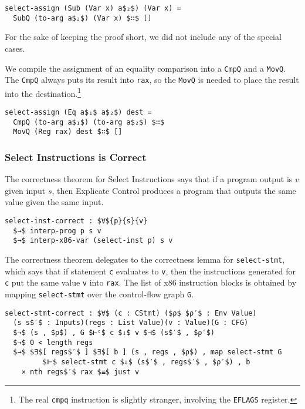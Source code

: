 \documentclass[sigplan,review,dvipsnames,screen,10pt]{acmart}
\begin{document}
\begin{lstlisting}
select-assign (Sub (Var x) a$₂$) (Var x) = 
  SubQ (to-arg a$₂$) (Var x) $∷$ []
\end{lstlisting}

\noindent For the sake of keeping the proof short, we did not include
any of the special cases.

We compile the assignment of an equality comparison into a
\lstinline{CmpQ} and a \lstinline{MovQ}. The \lstinline{CmpQ} always
puts its result into \lstinline{rax}, so the \lstinline{MovQ} is
needed to place the result into the destination.\footnote{The real
\lstinline{cmpq} instruction is slightly stranger, involving
the \lstinline{EFLAGS} register.}

\begin{lstlisting}
select-assign (Eq a$₁$ a$₂$) dest =
  CmpQ (to-arg a$₁$) (to-arg a$₂$) $∷$
  MovQ (Reg rax) dest $∷$ []
\end{lstlisting}


\subsubsection{Select Instructions is Correct}

The correctness theorem for Select Instructions says that if a program
output is $v$ given input $s$, then Explicate Control produces a
program that outputs the same value given the same input.

\begin{lstlisting}
select-inst-correct : $∀${p}{s}{v}
  $→$ interp-prog p s v
  $→$ interp-x86-var (select-inst p) s v
\end{lstlisting}

The correctness theorem delegates to the correctness lemma for
\lstinline{select-stmt}, which says that if statement \lstinline{c}
evaluates to \lstinline{v}, then the instructions generated for
\lstinline{c} put the same value \lstinline{v} into \lstinline{rax}.
The list of x86 instruction blocks is obtained by mapping
\lstinline{select-stmt} over the control-flow graph \lstinline{G}.

\begin{lstlisting}[basicstyle=\ttfamily\footnotesize]
select-stmt-correct : $∀$ (c : CStmt) ($ρ$ $ρ′$ : Env Value)
  (s s$′$ : Inputs)(regs : List Value)(v : Value)(G : CFG)
  $→$ (s , $ρ$) , G $⊢ᶜ$ c $⇓$ v $⊣$ (s$′$ , $ρ′$)
  $→$ 0 < length regs
  $→$ $∃$[ regs$′$ ] $∃$[ b ] (s , regs , $ρ$) , map select-stmt G
         $⊩$ select-stmt c $⇓$ (s$′$ , regs$′$ , $ρ′$) , b
    × nth regs$′$ rax $≡$ just v
\end{lstlisting}
\end{document}
